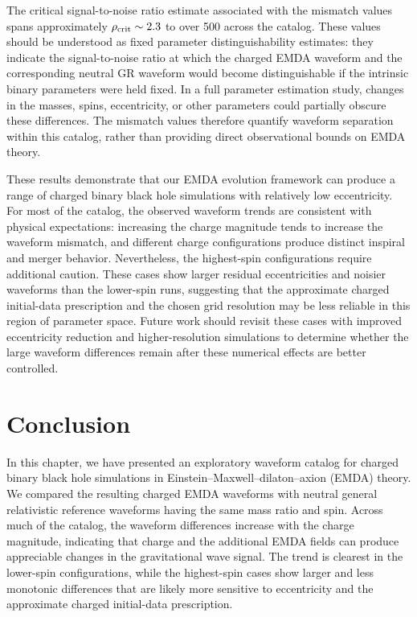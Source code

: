 The critical signal-to-noise ratio estimate associated with the mismatch values spans approximately $\rho_{\rm crit}\sim2.3$ to over 500 across the catalog. These values should be understood as fixed parameter distinguishability estimates: they indicate the signal-to-noise ratio at which the charged EMDA waveform and the corresponding neutral GR waveform would become distinguishable if the intrinsic binary parameters were held fixed. In a full parameter estimation study, changes in the masses, spins, eccentricity, or other parameters could partially obscure these differences. The mismatch values therefore quantify waveform separation within this catalog, rather than providing direct observational bounds on EMDA theory.

These results demonstrate that our EMDA evolution framework can produce a range of charged binary black hole simulations with relatively low eccentricity. For most of the catalog, the observed waveform trends are consistent with physical expectations: increasing the charge magnitude tends to increase the waveform mismatch, and different charge configurations produce distinct inspiral and merger behavior. Nevertheless, the highest-spin configurations require additional caution. These cases show larger residual eccentricities and noisier waveforms than the lower-spin runs, suggesting that the approximate charged initial-data prescription and the chosen grid resolution may be less reliable in this region of parameter space. Future work should revisit these cases with improved eccentricity reduction and higher-resolution simulations to determine whether the large waveform differences remain after these numerical effects are better controlled.
\section{Conclusion}
\label{sec:conclusion}

In this chapter, we have presented an exploratory waveform catalog for charged binary black hole simulations in Einstein--Maxwell--dilaton--axion (EMDA) theory. We compared the resulting charged EMDA waveforms with neutral general relativistic reference waveforms having the same mass ratio and spin. Across much of the catalog, the waveform differences increase with the charge magnitude, indicating that charge and the additional EMDA fields can produce appreciable changes in the gravitational wave signal. The trend is clearest in the lower-spin configurations, while the highest-spin cases show larger and less monotonic differences that are likely more sensitive to eccentricity and the approximate charged initial-data prescription.

